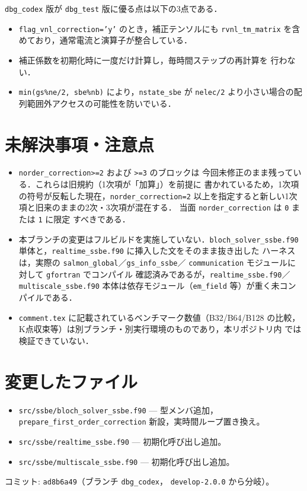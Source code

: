 \documentclass[dvipdfmx,a4paper,11pt]{jsarticle}
\newcommand{\file}[1]{\texttt{#1}}
\begin{document}
\texttt{dbg\_codex} 版が \texttt{dbg\_test} 版に優る点は以下の3点である．
\begin{itemize}[nosep]
  \item \texttt{flag\_vnl\_correction='y'} のとき，補正テンソルにも
    \texttt{rvnl\_tm\_matrix} を含めており，通常電流と演算子が整合している．
  \item 補正係数を初期化時に一度だけ計算し，毎時間ステップの再計算を
    行わない．
  \item \texttt{min(gs\%ne/2, sbe\%nb)} により，\texttt{nstate\_sbe} が
    \texttt{nelec/2} より小さい場合の配列範囲外アクセスの可能性を防いでいる．
\end{itemize}

\section{未解決事項・注意点}
\begin{itemize}[nosep]
  \item \texttt{norder\_correction>=2} および \texttt{>=3} のブロックは
    今回未修正のまま残っている．これらは旧規約（1次項が「加算」）を前提に
    書かれているため，1次項の符号が反転した現在，\texttt{norder\_correction=2}
    以上を指定すると新しい1次項と旧来のままの2次・3次項が混在する．
    当面 \texttt{norder\_correction} は \texttt{0} または \texttt{1} に限定
    すべきである．
  \item 本ブランチの変更はフルビルドを実施していない．\file{bloch\_solver\_ssbe.f90}
    単体と，\file{realtime\_ssbe.f90} に挿入した文をそのまま抜き出した
    ハーネスは，実際の \texttt{salmon\_global}／\texttt{gs\_info\_ssbe}／
    \texttt{communication} モジュールに対して \texttt{gfortran} でコンパイル
    確認済みであるが，\file{realtime\_ssbe.f90}／\file{multiscale\_ssbe.f90}
    本体は依存モジュール（\texttt{em\_field} 等）が重く未コンパイルである．
  \item \file{comment.tex} に記載されているベンチマーク数値（B32/B64/B128
    の比較，K点収束等）は別ブランチ・別実行環境のものであり，本リポジトリ内
    では検証できていない．
\end{itemize}

\section{変更したファイル}
\begin{itemize}[nosep]
  \item \file{src/ssbe/bloch\_solver\_ssbe.f90} --- 型メンバ追加，
    \texttt{prepare\_first\_order\_correction} 新設，実時間ループ置き換え。
  \item \file{src/ssbe/realtime\_ssbe.f90} --- 初期化呼び出し追加。
  \item \file{src/ssbe/multiscale\_ssbe.f90} --- 初期化呼び出し追加。
\end{itemize}
コミット: \texttt{ad8b6a49}（ブランチ \texttt{dbg\_codex}，
\texttt{develop-2.0.0} から分岐）。
\end{document}
